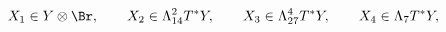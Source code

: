 \begin{equation}
X_1 \in Y\otimes \Br , \qquad
X_2 \in \Lambda^2_{14} T^*Y , \qquad
X_3 \in \Lambda^4_{27} T^*Y , \qquad
X_4 \in \Lambda_{7} T^*Y , \label{def.Xs}
\end{equation} 
